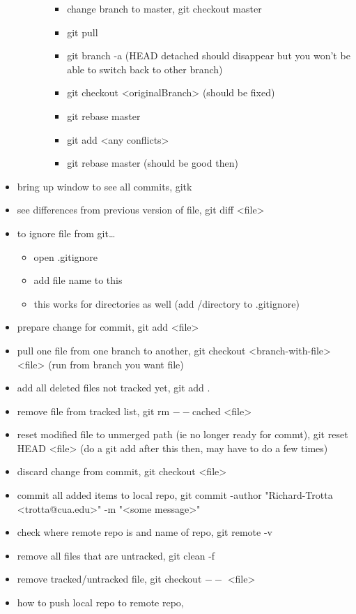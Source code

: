 \documentclass[11pt]{article}
\begin{document}
\begin{itemize}
\begin{itemize}
\begin{itemize}
\begin{itemize}
\item change branch to master, git checkout master
\item git pull
\item git branch -a (HEAD detached should disappear but you won't be able to switch back to other branch)
\item git checkout <originalBranch> (should be fixed)
\item git rebase master
\item git add <any conflicts>
\item git rebase master (should be good then)
\end{itemize}
\end{itemize}
\end{itemize}
\item bring up window to see all commits, gitk
\item see differences from previous version of file, git diff <file>
\item to ignore file from git\ldots{}
\begin{itemize}
\item open .gitignore
\item add file name to this
\item this works for directories as well (add /directory to .gitignore)
\end{itemize}
\item prepare change for commit, git add <file>
\item pull one file from one branch to another, git checkout <branch-with-file> <file> (run from branch you want file)
\item add all deleted files not tracked yet, git add .
\item remove file from tracked list, git rm \(--\)cached <file>
\item reset modified file to unmerged path (ie no longer ready for commt), git reset HEAD <file> (do a git add after this then, may have to do a few times)
\item discard change from commit, git checkout <file>
\item commit all added items to local repo, git commit -author "Richard-Trotta <trotta@cua.edu>" -m "<some message>"
\item check where remote repo is and name of repo, git remote -v
\item remove all files that are untracked, git clean -f
\item remove tracked/untracked file, git checkout \(--\) <file>
\item how to push local repo to remote repo,

\end{itemize}
\end{document}
